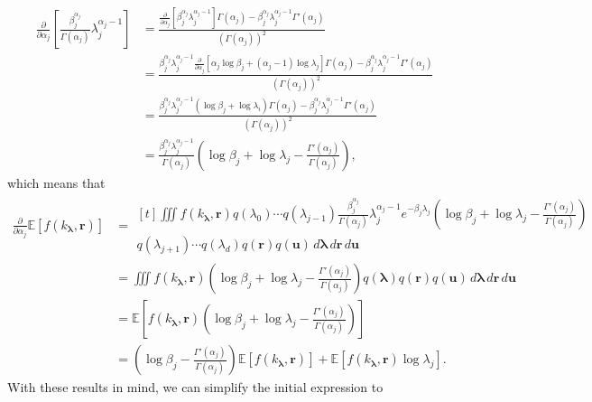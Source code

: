 \documentclass{article}
\theoremstyle{definition}
\theoremstyle{remark}
\newcommand{\da}{\frac{\partial}{\partial\alpha_j}}
\begin{document}
\[
  \begin{split}
    \da \left[ \frac{\beta_j^{\alpha_j}}{\Gamma(\alpha_j)} \lambda_j^{\alpha_j - 1} \right] &=
    \frac{\da[\beta_j^{\alpha_j}\lambda_j^{\alpha_j - 1}]\Gamma(\alpha_j) -
      \beta_j^{\alpha_j}\lambda_j^{\alpha_j - 1}\Gamma'(\alpha_j)}{(\Gamma(\alpha_j))^2} \\
    &= \frac{\beta_j^{\alpha_j}\lambda_j^{\alpha_j - 1}\da[\alpha_j\log\beta_j + (\alpha_j -
      1)\log\lambda_j]\Gamma(\alpha_j) - \beta_j^{\alpha_j}\lambda_j^{\alpha_j -
        1}\Gamma'(\alpha_j)}{(\Gamma(\alpha_j))^2} \\
    &= \frac{\beta_j^{\alpha_j}\lambda_j^{\alpha_j - 1}(\log\beta_j + \log\lambda_i)\Gamma(\alpha_j)
      - \beta_j^{\alpha_j}\lambda_j^{\alpha_j - 1}\Gamma'(\alpha_j)}{(\Gamma(\alpha_j))^2} \\
    &= \frac{\beta_j^{\alpha_j}\lambda_j^{\alpha_j - 1}}{\Gamma(\alpha_j)}\left(\log\beta_j +
    \log\lambda_j - \frac{\Gamma'(\alpha_j)}{\Gamma(\alpha_j)}\right),
  \end{split}
\]
which means that
\[
  \begin{split}
    \da\mathbb{E}[f(k_{\bm\lambda}, \mathbf{r})] &= \begin{multlined}[t]
      \iiint f(k_{\bm\lambda}, \mathbf{r}) q(\lambda_0) \cdots q(\lambda_{j-1})
      \frac{\beta_j^{\alpha_j}}{\Gamma(\alpha_j)}\lambda_j^{\alpha_j -
        1}e^{-\beta_j\lambda_j} \left(\log\beta_j + \log\lambda_j -
        \frac{\Gamma'(\alpha_j)}{\Gamma(\alpha_j)} \right) \\
      q(\lambda_{j+1}) \cdots q(\lambda_d)
      q(\mathbf{r})q(\mathbf{u})\,d\bm\lambda\,d\mathbf{r}\,d\mathbf{u}
    \end{multlined} \\
    &= \iiint f(k_{\bm\lambda}, \mathbf{r}) \left(\log\beta_j + \log\lambda_j -
      \frac{\Gamma'(\alpha_j)}{\Gamma(\alpha_j)} \right) q(\bm\lambda)
    q(\mathbf{r})q(\mathbf{u})\,d\bm\lambda\,d\mathbf{r}\,d\mathbf{u} \\
    &= \mathbb{E} \left[ f(k_{\bm\lambda}, \mathbf{r}) \left(\log\beta_j +
        \log\lambda_j - \frac{\Gamma'(\alpha_j)}{\Gamma(\alpha_j)} \right)
    \right] \\
    &= \left( \log\beta_j - \frac{\Gamma'(\alpha_j)}{\Gamma(\alpha_j)}
    \right)\mathbb{E}[f(k_{\bm\lambda}, \mathbf{r})] +
    \mathbb{E}[f(k_{\bm\lambda}, \mathbf{r})\log\lambda_j].
  \end{split}
\]
With these results in mind, we can simplify the initial expression to
\end{document}

